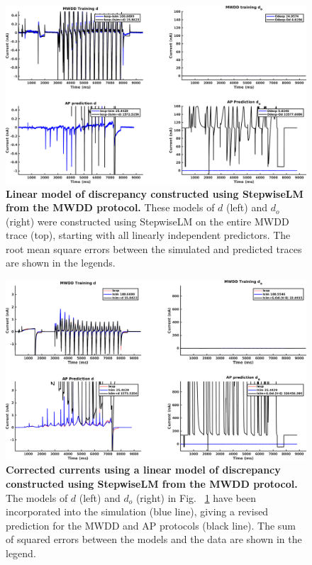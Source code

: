 \documentclass[11pt,a4paper,oneside]{article}
\begin{document}
\clearpage

\begin{figure}[t]
\begin{center}
\includegraphics[scale=0.42]{Figures/StepwiseLM_MWDD_AP_full_discrepancy.png}
\caption{\textbf{Linear model of discrepancy constructed using StepwiseLM from the MWDD protocol.} These models of $d$ (left) and $d_o$ (right) were constructed using StepwiseLM on the entire MWDD trace (top), starting with all linearly independent predictors. The root mean square errors between the simulated and predicted traces are shown in the legends. } 
\label{Fig_StepwiseLM_MWDD_AP_full_discrepancy}
\end{center}
\end{figure}

\begin{figure}[hb]
\begin{center}
\includegraphics[scale=0.42]{Figures/StepwiseLM_MWDD_AP_full_currents.png}
\caption{\textbf{Corrected currents using a linear model of discrepancy constructed using StepwiseLM from the MWDD protocol.} The models of $d$ (left) and $d_o$ (right) in Fig. ~\ref{Fig_StepwiseLM_MWDD_AP_full_discrepancy} have been incorporated into the simulation (blue line), giving a revised prediction for the MWDD and AP protocols (black line). The sum of squared errors between the models and the data are shown in the legend.}
\label{Fig_StepwiseLM_MWDD_AP_full_currents}
\end{center}
\end{figure}
\end{document}
